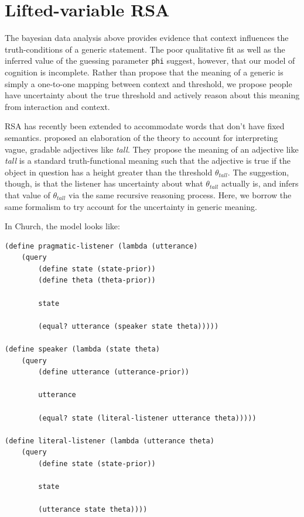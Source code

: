 \documentclass[10pt,letterpaper]{article}
\begin{document}
\section{Lifted-variable RSA}

The bayesian data analysis above provides evidence that context influences the truth-conditions of a generic statement. The poor qualitative fit as well as the inferred value of the guessing parameter \lstinline{phi} suggest, however, that our model of cognition is incomplete. Rather than propose that the meaning of a generic is simply a one-to-one mapping between context and threshold, we propose people have uncertainty about the true threshold and actively reason about this meaning from interaction and context. 



RSA has recently been extended to accommodate words that don't have fixed semantics.  proposed an elaboration of the theory to account for interpreting vague, gradable adjectives like \emph{tall}. They propose the meaning of an adjective like \emph{tall} is a standard truth-functional meaning such that the adjective is true if the object in question has a height greater than the threshold $\theta_{tall}$. The suggestion, though, is that the listener has uncertainty about what $\theta_{tall}$ actually is, and infers that value of $\theta_{tall}$ via the same recursive reasoning process. Here, we borrow the same formalism to try account for the uncertainty in generic meaning.

In Church, the model looks like:

\begin{lstlisting}
(define pragmatic-listener (lambda (utterance)
	(query
		(define state (state-prior))
		(define theta (theta-prior))
			
		state
			
		(equal? utterance (speaker state theta)))))
			
(define speaker (lambda (state theta)
	(query
		(define utterance (utterance-prior))
			
		utterance
			
		(equal? state (literal-listener utterance theta)))))
			
(define literal-listener (lambda (utterance theta)
	(query
		(define state (state-prior))
			
		state
			
		(utterance state theta))))
\end{lstlisting}
\end{document}
